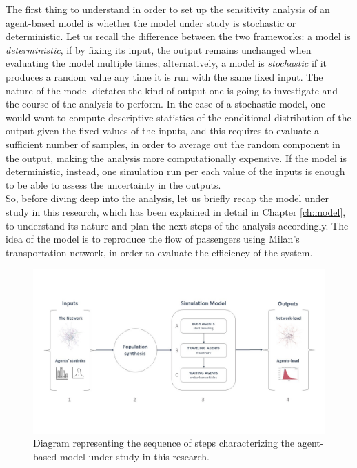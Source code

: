The first thing to understand in order to set up the sensitivity analysis of an agent-based model is whether the model under study is stochastic or deterministic. Let us recall the difference between the two frameworks: a model is \textit{deterministic}, if by fixing its input, the output remains unchanged when evaluating the model multiple times; alternatively, a model is \textit{stochastic} if it produces a random value any time it is run with the same fixed input. The nature of the model dictates the kind of output one is going to investigate and the course of the analysis to perform. In the case of a stochastic model, one would want to compute descriptive statistics of the conditional distribution of the output given the fixed values of the inputs, and this requires to evaluate a sufficient number of samples, in order to average out the random component in the output, making the analysis more computationally expensive. If the model is deterministic, instead, one simulation run per each value of the inputs is enough to be able to assess the uncertainty in the outputs. \\ So, before diving deep into the analysis, let us briefly recap the model under study in this research, which has been explained in detail in Chapter \ref{ch:model}, to understand its nature and plan the next steps of the analysis accordingly. The idea of the model is to reproduce the flow of passengers using Milan's transportation network, in order to evaluate the efficiency of the system.
\begin{figure}
    \centering
    \includegraphics[width = \textwidth]{tex/pics/model_ppt2.jpg}
    \caption{Diagram representing the sequence of steps characterizing the agent-based model under study in this research.}
    \label{fig:model_schema}
\end{figure}
